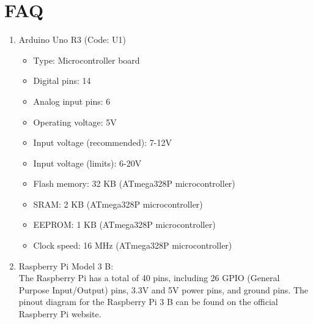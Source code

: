 \documentclass[11pt]{article}
\begin{document}
\section{FAQ}
\begin{enumerate}
	\item Arduino Uno R3 (Code: U1)
	      \begin{itemize}
		      \item Type: Microcontroller board
		      \item Digital pins: 14
		      \item Analog input pins: 6
		      \item Operating voltage: 5V
		      \item Input voltage (recommended): 7-12V
		      \item Input voltage (limits): 6-20V
		      \item Flash memory: 32 KB (ATmega328P microcontroller)
		      \item SRAM: 2 KB (ATmega328P microcontroller)
		      \item EEPROM: 1 KB (ATmega328P microcontroller)
		      \item Clock speed: 16 MHz (ATmega328P microcontroller)
	      \end{itemize}
	\item Raspberry Pi Model 3 B: \\
	      The Raspberry Pi has a total of 40 pins, including 26 GPIO (General Purpose Input/Output) pins, 3.3V and 5V power pins, and ground pins. The pinout diagram for the Raspberry Pi 3 B can be found on the official Raspberry Pi website.


\end{enumerate}
\end{document}
